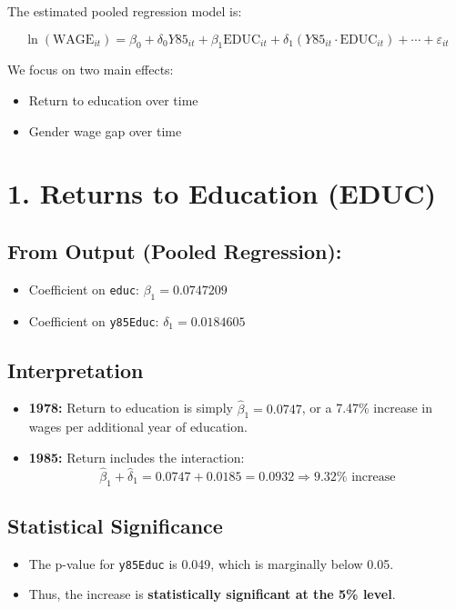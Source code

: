 \documentclass[12pt, oneside]{article}
\begin{document}
The estimated pooled regression model is:

\[
\ln(\text{WAGE}_{it}) = \beta_0 + \delta_0 Y85_{it} + \beta_1 \text{EDUC}_{it} + \delta_1 (Y85_{it} \cdot \text{EDUC}_{it}) + \cdots + \varepsilon_{it}
\]

We focus on two main effects:
\begin{itemize}
  \item Return to education over time
  \item Gender wage gap over time
\end{itemize}

\section*{1. Returns to Education (EDUC)}

\subsection*{From Output (Pooled Regression):}
\begin{itemize}
  \item Coefficient on \texttt{educ}: \( \beta_1 = 0.0747209 \)
  \item Coefficient on \texttt{y85Educ}: \( \delta_1 = 0.0184605 \)
\end{itemize}

\subsection*{Interpretation}
\begin{itemize}
  \item \textbf{1978:} Return to education is simply \( \hat{\beta}_1 = 0.0747 \), or a 7.47\% increase in wages per additional year of education.
  \item \textbf{1985:} Return includes the interaction:
  \[
  \hat{\beta}_1 + \hat{\delta}_1 = 0.0747 + 0.0185 = 0.0932 \Rightarrow 9.32\% \text{ increase}
  \]
\end{itemize}

\subsection*{Statistical Significance}
\begin{itemize}
  \item The p-value for \texttt{y85Educ} is 0.049, which is marginally below 0.05.
  \item Thus, the increase is \textbf{statistically significant at the 5\% level}.
\end{itemize}
\end{document}
